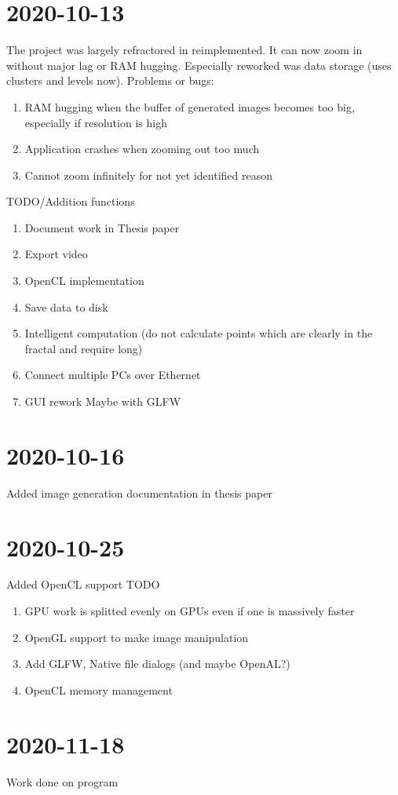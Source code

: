 \documentclass[10pt,a4paper]{article}
\begin{document}
	\section{2020-10-13}
	The project was largely refractored in reimplemented. It can now zoom in without major lag or RAM hugging. Especially reworked was data storage (uses clusters and levels now). Problems or bugs:
	\begin{enumerate}
		\item RAM hugging when the buffer of generated images becomes too big, especially if resolution is high
		\item Application crashes when zooming out too much
		\item Cannot zoom infinitely for not yet identified reason 
	\end{enumerate}
	TODO/Addition functions
	\begin{enumerate}
		\item Document work in Thesis paper
		\item Export video
		\item OpenCL implementation
		\item Save data to disk
		\item Intelligent computation (do not calculate points which are clearly in the fractal and require long)
		\item Connect multiple PCs over Ethernet
		\item GUI rework
		\subitem Maybe with GLFW
	\end{enumerate}

	\section{2020-10-16}
	Added image generation documentation in thesis paper
	\section{2020-10-25}
	Added OpenCL support
	TODO
	\begin{enumerate}
		\item GPU work is splitted evenly on GPUs even if one is massively faster
		\item OpenGL support to make image manipulation
		\item Add GLFW, Native file dialogs (and maybe OpenAL?)
		\item OpenCL memory management
	\end{enumerate}
	\section{2020-11-18}
	Work done on program
\end{document}
